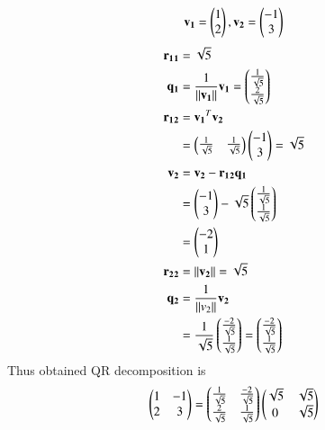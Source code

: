 \documentclass[journal,12pt,twocolumn]{IEEEtran}
\begin{document}
\begin{enumerate}
\begin{align}
\mathbf{v_1}=\begin{pmatrix}1 \\ 2\end{pmatrix},
\mathbf{v_2}=\begin{pmatrix}-1 \\ 3\end{pmatrix}
\end{align}
\begin{align}
\mathbf{r_1{}_1}&=\sqrt{5}
\\
\mathbf{q_1}&=\frac{1}{\left\lVert\mathbf{v_1}\right\rVert}{\mathbf{v_1}}=\begin{pmatrix}\frac{1}{\sqrt{5}} \\ \frac{2}{\sqrt{5}}\end{pmatrix}
\\
\mathbf{r_1{}_2}&=\mathbf{v_1}^{T}{\mathbf{v_2}} 
\\
&=\begin{pmatrix}\frac{1}{\sqrt{5}} & \frac{1}{\sqrt{5}}\end{pmatrix}\begin{pmatrix}-1 \\ 3 \end{pmatrix}=\sqrt{5}
\\
\mathbf{v_2}&=\mathbf{v_2}-\mathbf{r_1{}_2}\mathbf{q_1} \\
&=\begin{pmatrix}-1 \\ 3\end{pmatrix}-{\sqrt{5}}\begin{pmatrix}\frac{1}{\sqrt{5}} \\ \frac{1}{\sqrt{5}}\end{pmatrix}
\\
&=\begin{pmatrix}-2 \\ 1\end{pmatrix}
\\
\mathbf{r_2{}_2}&=\left\lVert\mathbf{v_2}\right\rVert=\sqrt{5}
\\
\mathbf{q_2}&=\frac{1}{\left\lVert v_2\right\rVert}\mathbf{v_2}
\\
&=\frac{1}{\sqrt{5}}\begin{pmatrix}\frac{-2}{\sqrt{5}} \\ \frac{1}{\sqrt{5}}\end{pmatrix}=\begin{pmatrix}\frac{-2}{\sqrt{5}}\\{\frac{1}{\sqrt{5}}}\end{pmatrix}
\end{align}
Thus obtained QR decomposition is 
\begin{align}
\begin{pmatrix}1 & -1 \\ 2 & 3\end{pmatrix}=\begin{pmatrix}\frac{1}{\sqrt{5}} & \frac{-2}{\sqrt{5}} \\ \frac{2}{\sqrt{5}} & \frac{1}{\sqrt{5}}\end{pmatrix}\begin{pmatrix}\sqrt{5} & \sqrt{5} \\ 0 & \sqrt{5}\end{pmatrix}
\end{align}
\end{enumerate}
\end{document}
